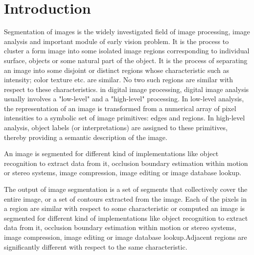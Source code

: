 \chapter{Introduction}
\label{intro}
Segmentation of images \cite{Segmentation} is the widely investigated field of image processing, image analysis and important module of early vision problem. It is the process to cluster a form image into some isolated image regions corresponding to individual surface, objects or some natural part of the object. It is the process of separating an image into some disjoint or distinct regions whose characteristic such as intensity; color texture etc. are similar. No two such regions are similar with respect to these characteristics. in digital image processing, digital image analysis usually involves a "low-level" and a "high-level" processing. In low-level analysis, the representation of an image is transformed from a numerical array of pixel intensities to a symbolic set of image primitives: edges and regions. In high-level analysis, object labels (or interpretations) are assigned to these primitives, thereby providing a semantic description of the image.

An image is segmented \cite{Segmentation} for different kind of implementations like object recognition to extract data from it, occlusion boundary estimation within motion or stereo systems, image compression, image editing or image database lookup.

The output of image segmentation is a set of segments that collectively cover the entire image, or a set of contours extracted from the image. Each of the pixels in a region are similar with respect to some characteristic or computed an image is segmented for different kind of implementations like object recognition to extract data from it, occlusion boundary estimation within motion or stereo systems, image compression, image editing or image database lookup.Adjacent regions are significantly different with respect to the same characteristic.
 
